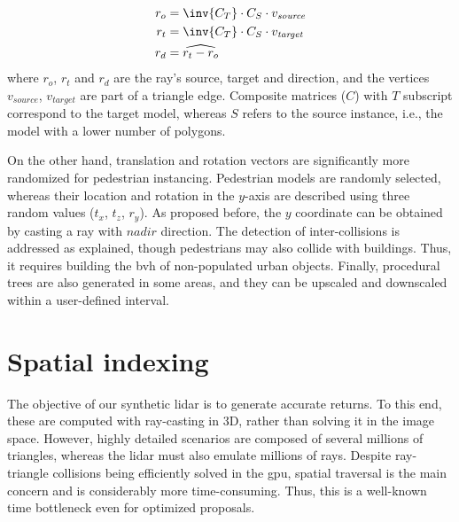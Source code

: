 \begin{gather}
    \label{eq:mesh_collision_ray}
    \begin{aligned}
        r_{o} &= \inv{C_{T}} \cdot C_{S} \cdot v_{\textit{source}}\\
        r_{t} &= \inv{C_{T}} \cdot C_{S} \cdot v_{\textit{target}}\\
        r_{d} &= \widehat{r_{t} - r_{o}}
    \end{aligned}
\end{gather}
where $r_{o}$, $r_{t}$ and $r_{d}$ are the ray's source, target and direction, and the vertices $v_{\textit{source}}$, $v_{\textit{target}}$ are part of a triangle edge. Composite matrices ($C$) with $T$ subscript correspond to the target model, whereas $S$ refers to the source instance, i.e., the model with a lower number of polygons.

On the other hand, translation and rotation vectors are significantly more randomized for pedestrian instancing. Pedestrian models are randomly selected, whereas their location and rotation in the $y$-axis are described using three random values ($t_x$, $t_z$, $r_y$). As proposed before, the $y$ coordinate can be obtained by casting a ray with $\textit{nadir}$ direction. The detection of inter-collisions is addressed as explained, though pedestrians may also collide with buildings. Thus, it requires building the \acrshort{bvh} of non-populated urban objects. Finally, procedural trees are also generated in some areas, and they can be upscaled and downscaled within a user-defined interval.

\section{Spatial indexing}

The objective of our synthetic \acrshort{lidar} is to generate accurate returns. To this end, these are computed with ray-casting in 3D, rather than solving it in the image space. However, highly detailed scenarios are composed of several millions of triangles, whereas the \acrshort{lidar} must also emulate millions of rays. Despite ray-triangle collisions being efficiently solved in the \acrshort{gpu}, spatial traversal is the main concern and is considerably more time-consuming. Thus, this is a well-known time bottleneck even for optimized proposals. 


